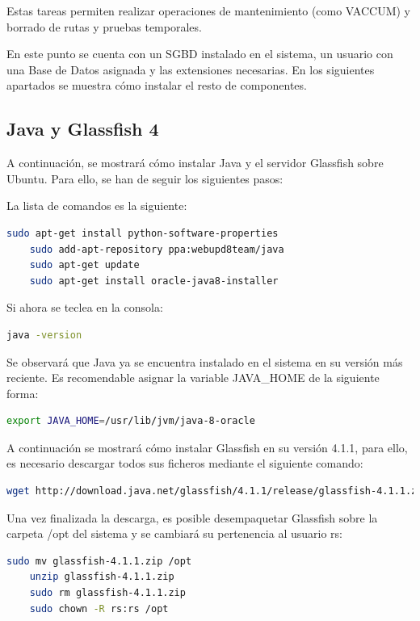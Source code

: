 Estas tareas permiten realizar operaciones de mantenimiento (como VACCUM) y borrado de rutas y pruebas temporales.

En este punto se cuenta con un SGBD instalado en el sistema, un usuario con una Base de Datos asignada y las extensiones necesarias. En los siguientes apartados se muestra cómo instalar el resto de componentes.

\subsection{Java y Glassfish 4}
A continuación, se mostrará cómo instalar Java y el servidor Glassfish sobre Ubuntu. Para ello, se han de seguir los siguientes pasos:

La lista de comandos es la siguiente:
\begin{lstlisting}[language=bash]
	sudo apt-get install python-software-properties
	sudo add-apt-repository ppa:webupd8team/java
	sudo apt-get update
	sudo apt-get install oracle-java8-installer
\end{lstlisting}

Si ahora se teclea en la consola:
\begin{lstlisting}[language=bash]
	java -version
\end{lstlisting}

Se observará que Java ya se encuentra instalado en el sistema en su versión más reciente.  Es recomendable asignar la variable JAVA\_HOME de la siguiente forma:

\begin{lstlisting}[language=bash]
	export JAVA_HOME=/usr/lib/jvm/java-8-oracle
\end{lstlisting}


A continuación se mostrará cómo instalar Glassfish en su versión 4.1.1, para ello, es necesario descargar todos sus ficheros mediante el siguiente comando:


\begin{lstlisting}[language=bash]
	wget http://download.java.net/glassfish/4.1.1/release/glassfish-4.1.1.zip
\end{lstlisting}

Una vez finalizada la descarga, es posible desempaquetar Glassfish sobre la carpeta /opt del sistema y se cambiará su pertenencia al usuario rs:

\begin{lstlisting}[language=bash]
	sudo mv glassfish-4.1.1.zip /opt
	unzip glassfish-4.1.1.zip
	sudo rm glassfish-4.1.1.zip
	sudo chown -R rs:rs /opt 
\end{lstlisting}

